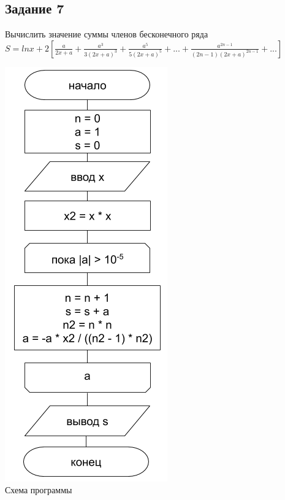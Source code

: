 \documentclass[a4paper,14pt]{extarticle}
\begin{document}
\subsection{Задание 7}
Вычислить значение суммы членов бесконечного ряда\\
$S = ln x + 2[\frac {a} {2x+a} + \frac {a^3} {3(2x+a)^3} + \frac {a^5} {5(2x+a)^5}
+ ... + \frac {a^{2n-1}} {(2n-1)(2x+a)^{2n-1}} + ...]$
\begin{center}
\includegraphics[scale=0.6]{lab2-7.png}\\
Схема программы
\end{center}

\end{document}
